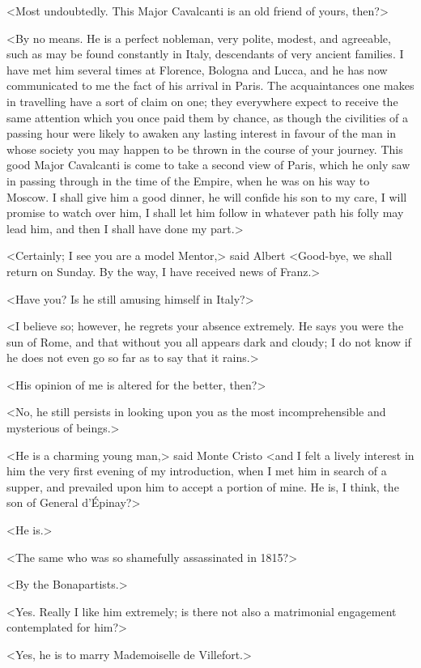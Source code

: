  <Most undoubtedly. This Major Cavalcanti is an old friend of yours, then?> 

 <By no means. He is a perfect nobleman, very polite, modest, and agreeable, such as may be found constantly in Italy, descendants of very ancient families. I have met him several times at Florence, Bologna and Lucca, and he has now communicated to me the fact of his arrival in Paris. The acquaintances one makes in travelling have a sort of claim on one; they everywhere expect to receive the same attention which you once paid them by chance, as though the civilities of a passing hour were likely to awaken any lasting interest in favour of the man in whose society you may happen to be thrown in the course of your journey. This good Major Cavalcanti is come to take a second view of Paris, which he only saw in passing through in the time of the Empire, when he was on his way to Moscow. I shall give him a good dinner, he will confide his son to my care, I will promise to watch over him, I shall let him follow in whatever path his folly may lead him, and then I shall have done my part.> 

 <Certainly; I see you are a model Mentor,> said Albert <Good-bye, we shall return on Sunday. By the way, I have received news of Franz.> 

 <Have you? Is he still amusing himself in Italy?> 

 <I believe so; however, he regrets your absence extremely. He says you were the sun of Rome, and that without you all appears dark and cloudy; I do not know if he does not even go so far as to say that it rains.> 

 <His opinion of me is altered for the better, then?> 

 <No, he still persists in looking upon you as the most incomprehensible and mysterious of beings.> 

 <He is a charming young man,> said Monte Cristo <and I felt a lively interest in him the very first evening of my introduction, when I met him in search of a supper, and prevailed upon him to accept a portion of mine. He is, I think, the son of General d'Épinay?> 

 <He is.> 

 <The same who was so shamefully assassinated in 1815?> 

 <By the Bonapartists.> 

 <Yes. Really I like him extremely; is there not also a matrimonial engagement contemplated for him?> 

 <Yes, he is to marry Mademoiselle de Villefort.> 

